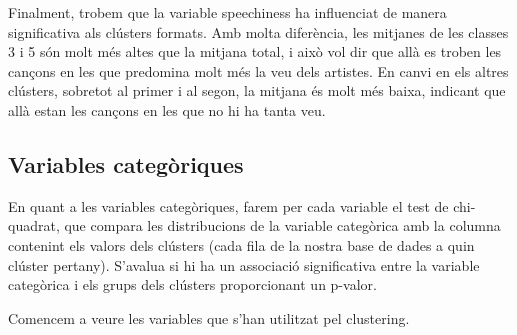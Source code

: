 Finalment, trobem que la variable speechiness ha influenciat de manera significativa als clústers formats. Amb molta diferència, les mitjanes de les classes 3 i 5 són molt més altes que la mitjana total, i això vol dir que allà es troben les cançons en les que predomina molt més la veu dels artistes. En canvi en els altres clústers, sobretot al primer i al segon, la mitjana és molt més baixa, indicant que allà estan les cançons en les que no hi ha tanta veu. 



\subsection{Variables categòriques}

En quant a les variables categòriques, farem per cada variable el test de chi-quadrat, que compara les distribucions de la variable categòrica amb la columna contenint els valors dels clústers (cada fila de la nostra base de dades a quin clúster pertany). S'avalua si hi ha un associació significativa entre la variable categòrica i els grups dels clústers proporcionant un p-valor.

Comencem a veure les variables que s'han utilitzat pel clustering.

